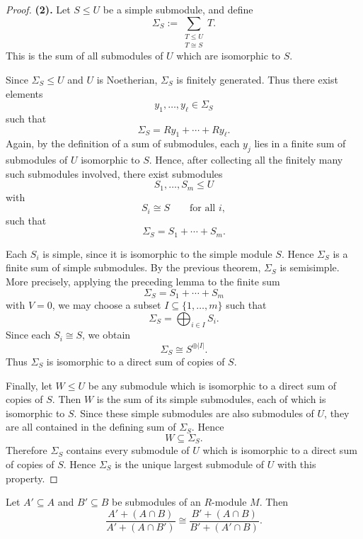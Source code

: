 \begin{proof}
    \medskip

    \noindent
    \textbf{(2).} Let \(S\leq U\) be a simple submodule, and define
    \[
        \Sigma_S
        :=
        \sum_{\substack{T\leq U\\ T\cong S}} T.
    \]
    This is the sum of all submodules of \(U\) which are isomorphic to \(S\).

    Since \(\Sigma_S\leq U\) and \(U\) is Noetherian, \(\Sigma_S\) is finitely generated.
    Thus there exist elements
    \[
        y_1,\dots,y_\ell\in \Sigma_S
    \]
    such that
    \[
        \Sigma_S=Ry_1+\cdots+Ry_\ell.
    \]
    Again, by the definition of a sum of submodules, each \(y_j\) lies in a finite sum
    of submodules of \(U\) isomorphic to \(S\). Hence, after collecting all the finitely
    many such submodules involved, there exist submodules
    \[
        S_1,\dots,S_m\leq U
    \]
    with
    \[
        S_i\cong S
        \qquad
        \text{for all } i,
    \]
    such that
    \[
        \Sigma_S=S_1+\cdots+S_m.
    \]

    Each \(S_i\) is simple, since it is isomorphic to the simple module \(S\). Hence
    \(\Sigma_S\) is a finite sum of simple submodules. By the previous theorem,
    \(\Sigma_S\) is semisimple. More precisely, applying the preceding lemma to the
    finite sum
    \[
        \Sigma_S=S_1+\cdots+S_m
    \]
    with \(V=0\), we may choose a subset \(I\subseteq\{1,\dots,m\}\) such that
    \[
        \Sigma_S=\bigoplus_{i\in I} S_i.
    \]
    Since each \(S_i\cong S\), we obtain
    \[
        \Sigma_S\cong S^{\oplus |I|}.
    \]
    Thus \(\Sigma_S\) is isomorphic to a direct sum of copies of \(S\).

    Finally, let \(W\leq U\) be any submodule which is isomorphic to a direct sum of
    copies of \(S\). Then \(W\) is the sum of its simple submodules, each of which is
    isomorphic to \(S\). Since these simple submodules are also submodules of \(U\),
    they are all contained in the defining sum of \(\Sigma_S\). Hence
    \[
        W\subseteq \Sigma_S.
    \]
    Therefore \(\Sigma_S\) contains every submodule of \(U\) which is isomorphic to a
    direct sum of copies of \(S\). Hence \(\Sigma_S\) is the unique largest submodule of
    \(U\) with this property.
\end{proof}

\begin{theorem}
    Let $A'\subseteq A$ and $B'\subseteq B$ be submodules of an $R$-module $M$.
    Then
    \[
        \frac{A'+(A\cap B)}{A'+(A\cap B')}
        \cong
        \frac{B'+(A\cap B)}{B'+(A'\cap B)}.
    \]
\end{theorem}

